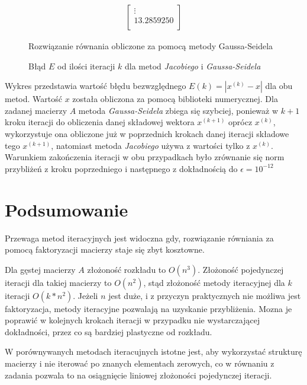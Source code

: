 \documentclass[11pt]{extarticle}
\begin{document}
\begin{figure}[H]
\begin{align}
\begin{bmatrix}
				\vdots \\
				13.2859250 \\ 
			\end{bmatrix}
		\end{align}
		\caption{Rozwiązanie równania obliczone za pomocą metody Gaussa-Seidela}
	\end{figure}

	\begin{figure}[H]
		\begin{center}
			
		\end{center}
		\caption{Błąd \(E\) od ilości iteracji \(k\) dla metod \textit{Jacobiego} i \textit{Gaussa-Seidela}}
	\end{figure}

	Wykres przedstawia wartość błędu bezwzględnego \(E(k) = |x^{(k)} - x|\) dla obu metod.
	Wartość \(x\) została obliczona za pomocą biblioteki numerycznej.
	Dla zadanej macierzy \(A\) metoda \textit{Gaussa-Seidela} zbiega się szybciej, ponieważ w \(k+1\) kroku iteracji do obliczenia danej składowej wektora \(x^{(k+1)}\) oprócz \(x^{(k)}\), wykorzystuje ona obliczone już w poprzednich krokach danej iteracji składowe tego \(x^{(k+1)}\), natomiast metoda \textit{Jacobiego} używa z wartości tylko z \(x^{(k)}\).
	Warunkiem zakończenia iteracji w obu przypadkach było zrównanie się norm przybliżeń z kroku poprzedniego i następnego z dokładnością do \(\epsilon = 10^{-12}\)

	\section{Podsumowanie}
	Przewaga metod iteracyjnych jest widoczna gdy, rozwiązanie równiania za pomocą faktoryzacji macierzy staje się zbyt kosztowne.
	
	Dla gęstej macierzy \(A\) złożoność rozkładu to \(O(n^3)\).
	Złożoność pojedynczej iteracji dla takiej macierzy to \(O(n^2)\), stąd złożoność metody iteracyjnej dla \(k\) iteracji \(O(k*n^2)\).
	Jeżeli \(n\) jest duże, i z przyczyn praktycznych nie możliwa jest faktoryzacja, metody iteracyjne pozwalają na uzyskanie przybliżenia.
	Mozna je poprawić w kolejnych krokach iteracji w przypadku nie wystarczającej dokładności, przez co są bardziej plastyczne od rozkładu.

	W porównywanych metodach iteracujnych istotne jest, aby wykorzystać strukturę macierzy i nie iterować po znanych elementach zerowych, co w równaniu z zadania pozwala to na osiągnięcie liniowej złożoności pojedynczej iteracji.
\end{document}
